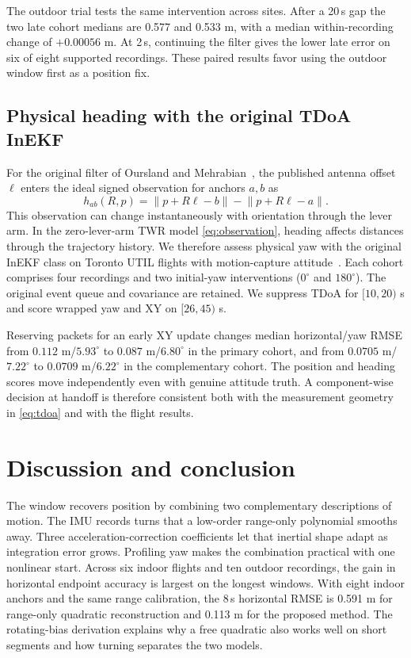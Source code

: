 \documentclass{IEEEtaes}
\newcommand{\norm}[1]{\left\lVert#1\right\rVert}
\begin{document}
The outdoor trial tests the same intervention across sites. After a 20\,s gap the two late cohort medians are 0.577 and 0.533 m, with a median within-recording change of \(+0.00056\) m. At 2\,s, continuing the filter gives the lower late error on six of eight supported recordings. These paired results favor using the outdoor window first as a position fix.

\subsection{Physical heading with the original TDoA InEKF}
For the original filter of Oursland and Mehrabian~\cite{oursland}, the published antenna offset \(\ell\) enters the ideal signed observation for anchors \(a,b\) as
\begin{equation}
 h_{ab}(R,p)=\norm{p+R\ell-b}-\norm{p+R\ell-a}. \label{eq:tdoa}
\end{equation}
This observation can change instantaneously with orientation through the lever arm. In the zero-lever-arm TWR model \eqref{eq:observation}, heading affects distances through the trajectory history. We therefore assess physical yaw with the original InEKF class on Toronto UTIL flights with motion-capture attitude~\cite{util}. Each cohort comprises four recordings and two initial-yaw interventions (\(0^\circ\) and \(180^\circ\)). The original event queue and covariance are retained. We suppress TDoA for \([10,20)\) s and score wrapped yaw and XY on \([26,45)\) s.

Reserving packets for an early XY update changes median horizontal/yaw RMSE from \(0.112\) m/\(5.93^\circ\) to \(0.087\) m/\(6.80^\circ\) in the primary cohort, and from \(0.0705\) m/\(7.22^\circ\) to \(0.0709\) m/\(6.22^\circ\) in the complementary cohort. The position and heading scores move independently even with genuine attitude truth. A component-wise decision at handoff is therefore consistent both with the measurement geometry in \eqref{eq:tdoa} and with the flight results.

\section{Discussion and conclusion}\label{sec:conclusion}
The window recovers position by combining two complementary descriptions of motion. The IMU records turns that a low-order range-only polynomial smooths away. Three acceleration-correction coefficients let that inertial shape adapt as integration error grows. Profiling yaw makes the combination practical with one nonlinear start. Across six indoor flights and ten outdoor recordings, the gain in horizontal endpoint accuracy is largest on the longest windows. With eight indoor anchors and the same range calibration, the 8\,s horizontal RMSE is 0.591 m for range-only quadratic reconstruction and 0.113 m for the proposed method. The rotating-bias derivation explains why a free quadratic also works well on short segments and how turning separates the two models.
\end{document}
